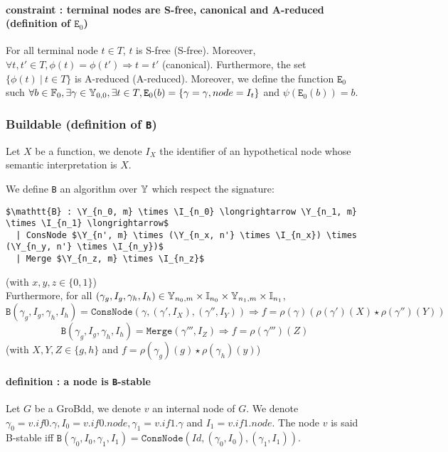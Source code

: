 \documentclass[a4paper,10pt]{article}
\begin{document}
\paragraph{constraint : terminal nodes are S-free, canonical and A-reduced (definition of $\mathtt{E}_0$)}
For all terminal node $t \in T$, $t$ is S-free (S-free).
Moreover, $\forall t, t' \in T, \phi(t) = \phi(t') \Rightarrow t = t'$ (canonical).
Furthermore, the set $\{\phi(t) ~|~ t\in T\}$ is A-reduced (A-reduced).
Moreover, we define the function $\mathtt{E}_0$ such $\forall b\in\mathbb{F}_0, \exists \gamma\in\mathbb{Y}_{0, 0}, \exists t\in T, \mathtt{E}_0(b) = \{\gamma = \gamma, node = I_t\}$ and $\psi(\mathtt{E}_0(b)) = b$.


\subsubsection{Buildable (definition of \texttt{B})}

Let $X$ be a function, we denote $I_X$ the identifier of an hypothetical node whose semantic interpretation is $X$.

We define \texttt{B} an algorithm over $\mathbb{Y}$ which respect the signature:
\begin{lstlisting}
$\mathtt{B} : \Y_{n_0, m} \times \I_{n_0} \longrightarrow \Y_{n_1, m} \times \I_{n_1} \longrightarrow$
  | ConsNode $\Y_{n', m} \times (\Y_{n_x, n'} \times \I_{n_x}) \times (\Y_{n_y, n'} \times \I_{n_y})$
  | Merge $\Y_{n_z, m} \times \I_{n_z}$
\end{lstlisting}
(with $x, y, z \in \{0, 1\}$) \\
Furthermore, for all $(\gamma_g, I_g, \gamma_h, I_h) \in \mathbb{Y}_{n_0, m} \times \mathbb{I}_{n_0} \times \mathbb{Y}_{n_1, m} \times \mathbb{I}_{n_1}$, 
\[ \texttt{B}(\gamma_g, I_g, \gamma_h, I_h) = \texttt{ConsNode} (\gamma, (\gamma', I_X), (\gamma'', I_Y)) \Rightarrow f = \rho\left(\gamma\right) \left(\rho\left(\gamma'\right)(X) \star \rho\left(\gamma''\right)(Y)\right)\]
\[ \texttt{B}(\gamma_g, I_g, \gamma_h, I_h) = \texttt{Merge} (\gamma''', I_Z) \Rightarrow f = \rho(\gamma''')(Z) \]
(with $X, Y, Z \in\{g, h\}$ and $f = \rho(\gamma_g)(g) \star \rho(\gamma_h)(y)$)

\paragraph{definition : a node is \texttt{B}-stable\\}
Let $G$ be a GroBdd, we denote $v$ an internal node of $G$.
We denote $\gamma_0 = v.if0.\gamma, I_0 = v.if0.node, \gamma_1 = v.if1.\gamma$ and $I_1 = v.if1.node$.
The node $v$ is said B-stable iff $\mathtt{B}(\gamma_0, I_0, \gamma_1, I_1) = \mathtt{ConsNode}(Id, (\gamma_0, I_0), (\gamma_1, I_1))$.
\end{document}
